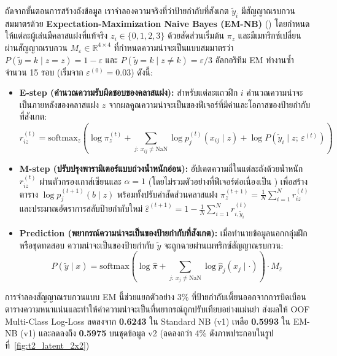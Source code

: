 ถัดจากขั้นตอนการสร้างถังข้อมูล เราจำลองความจริงที่ว่าป้ายกำกับที่สังเกต $\tilde{y}_i$ มีสัญญาณรบกวนสมมาตรด้วย \textbf{Expectation-Maximization Naive Bayes (EM-NB)} () โดยกำหนดให้แต่ละผู้เล่นมีคลาสแฝงที่แท้จริง $z_i \in \{0, 1, 2, 3\}$ ด้วยสัดส่วนเริ่มต้น $\pi_z$ และมีเมทริกซ์เปลี่ยนผ่านสัญญาณรบกวน $M_\varepsilon \in \mathbb{R}^{4 \times 4}$ ที่กำหนดความน่าจะเป็นแบบสมมาตรว่า $P(\tilde{y}=k \mid z=z) = 1 - \varepsilon$ และ $P(\tilde{y}=k \mid z \neq k) = \varepsilon / 3$ อัลกอริทึม EM ทำงานซ้ำจำนวน 15 รอบ (เริ่มจาก $\varepsilon^{(0)} = 0.03$) ดังนี้:
\begin{itemize}
  \item \textbf{E-step (คำนวณความรับผิดชอบของคลาสแฝง):} สำหรับแต่ละแถวฝึก $i$ คำนวณความน่าจะเป็นภายหลังของคลาสแฝง $z$ จากผลคูณความน่าจะเป็นของฟีเจอร์ที่มีค่าและโอกาสของป้ายกำกับที่สังเกต:
  \begin{equation}
  \label{eq:t2_estep}
  r_{iz}^{(t)} = \mathrm{softmax}_z\!\left(\log \pi_z^{(t)} + \sum_{j:\, x_{ij} \neq \mathrm{NaN}} \log p_j^{(t)}(x_{ij} \mid z) + \log P(\tilde{y}_i \mid z;\, \varepsilon^{(t)})\right)
  \end{equation}
  \item \textbf{M-step (ปรับปรุงพารามิเตอร์แบบถ่วงน้ำหนักอ่อน):} อัปเดตความถี่ในแต่ละถังด้วยน้ำหนัก $r_{iz}^{(t)}$ ผ่านตัวกรองเกาส์เซียนและ $\alpha=1$ (โดยไม่รวมตัวอย่างที่ฟีเจอร์ต่อเนื่องเป็น ) เพื่อสร้างตาราง $\log p_j^{(t+1)}(b \mid z)$ พร้อมทั้งปรับค่าสัดส่วนคลาสแฝง $\pi_z^{(t+1)} = \frac{1}{N}\sum_{i=1}^N r_{iz}^{(t)}$ และประมาณอัตราการสลับป้ายกำกับใหม่ $\hat{\varepsilon}^{(t+1)} = 1 - \frac{1}{N}\sum_{i=1}^N r_{i,\tilde{y}_i}^{(t)}$
  \item \textbf{Prediction (พยากรณ์ความน่าจะเป็นของป้ายกำกับที่สังเกต):} เมื่อทำนายข้อมูลนอกกลุ่มฝึกหรือชุดทดสอบ ความน่าจะเป็นของป้ายกำกับ $\tilde{y}$ จะถูกฉายผ่านเมทริกซ์สัญญาณรบกวน:
  \begin{equation}
  \label{eq:t2_em_pred}
  P(\tilde{y} \mid x) = \mathrm{softmax}\!\left(\log \hat{\pi} + \sum_{j:\, x_j \neq \mathrm{NaN}} \log \hat{p}_j(x_j \mid \cdot)\right) \cdot M_{\hat{\varepsilon}}
  \end{equation}
\end{itemize}
การจำลองสัญญาณรบกวนแบบ EM นี้ช่วยแยกตัวอย่าง 3\% ที่ป้ายกำกับเพี้ยนออกจากการบิดเบือนตารางความหนาแน่นและทำให้ค่าความน่าจะเป็นที่พยากรณ์ถูกปรับเทียบอย่างแม่นยำ ส่งผลให้ OOF Multi-Class Log-Loss ลดลงจาก \textbf{0.6243} ใน Standard NB (v1) เหลือ \textbf{0.5993} ใน EM-NB (v1) และลดลงถึง \textbf{0.5975} บนชุดข้อมูล v2 (ลดลงกว่า 4\% ดังภาพประกอบในรูปที่~\ref{fig:t2_latent_2x2})


